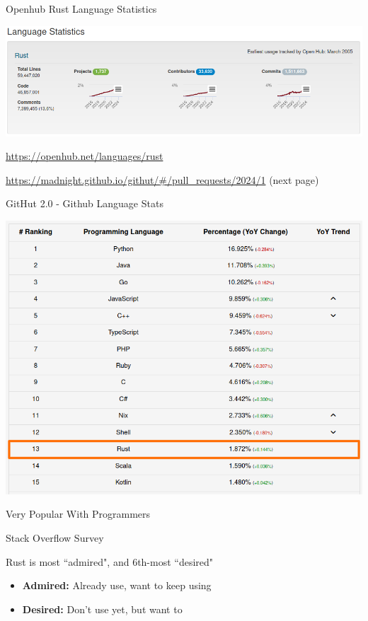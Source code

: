 \documentclass{beamer}
\begin{document}
\begin{frame}{Openhub Rust Language Statistics} 

\begin{center}
\includegraphics[scale=0.4]{openhub-statistics}
\end{center}

\url{https://openhub.net/languages/rust}


\url{https://madnight.github.io/githut/\#/pull_requests/2024/1}
(next page)

\end{frame} 

\begin{frame}{GitHut 2.0 - Github Language Stats } 
\begin{center}
\includegraphics[scale=0.4]{githut-statistics}
\end{center}
\end{frame} 


\begin{frame}{Very Popular With Programmers} 

	\begin{block}{Stack Overflow Survey}

   	Rust is most ``admired", and 6th-most ``desired"

   \end{block}


    \begin{itemize}
    \item \textbf{Admired:} Already use, want to keep using
    \item \textbf{Desired:} Don't use yet, but want to
    \end{itemize} 
    
\end{frame} 
\end{document}
